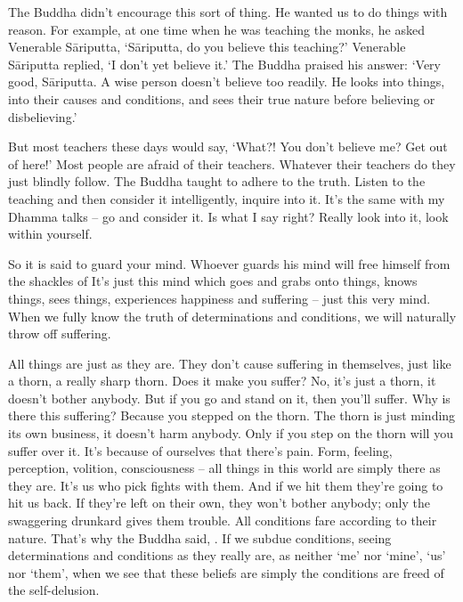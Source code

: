 The Buddha didn't encourage this sort of thing. He wanted us to do things with reason. For example, at one time when he was teaching the monks, he asked Venerable S\=ariputta, `S\=ariputta, do you believe this teaching?' Venerable S\=ariputta replied, `I don't yet believe it.' The Buddha praised his answer: `Very good, S\=ariputta. A wise person doesn't believe too readily. He looks into things, into their causes and conditions, and sees their true nature before believing or disbelieving.'

But most teachers these days would say, `What?! You don't believe me? Get out of here!' Most people are afraid of their teachers. Whatever their teachers do they just blindly follow. The Buddha taught to adhere to the truth. Listen to the teaching and then consider it intelligently, inquire into it. It's the same with my Dhamma talks -- go and consider it. Is what I say right? Really look into it, look within yourself.

So it is said to guard your mind. Whoever guards his mind will free himself from the shackles of  It's just this mind which goes and grabs onto things, knows things, sees things, experiences happiness and suffering -- just this very mind. When we fully know the truth of determinations and conditions, we will naturally throw off suffering.

All things are just as they are. They don't cause suffering in themselves, just like a thorn, a really sharp thorn. Does it make you suffer? No, it's just a thorn, it doesn't bother anybody. But if you go and stand on it, then you'll suffer. Why is there this suffering? Because you stepped on the thorn. The thorn is just minding its own business, it doesn't harm anybody. Only if you step on the thorn will you suffer over it. It's because of ourselves that there's pain. Form, feeling, perception, volition, consciousness -- all things in this world are simply there as they are. It's us who pick fights with them. And if we hit them they're going to hit us back. If they're left on their own, they won't bother anybody; only the swaggering drunkard gives them trouble. All conditions fare according to their nature. That's why the Buddha said, . If we subdue conditions, seeing determinations and conditions as they really are, as neither `me' nor `mine', `us' nor `them', when we see that these beliefs are simply  the conditions are freed of the self-delusion.

